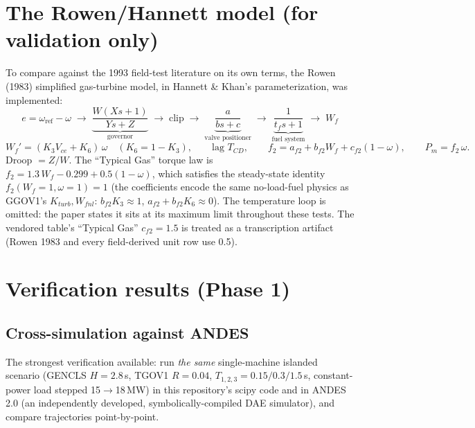 \documentclass[11pt]{article}
\begin{document}
\section{The Rowen/Hannett model (for validation only)}
\label{sec:rowen}

To compare against the 1993 field-test literature on its own terms, the
Rowen (1983) simplified gas-turbine model, in Hannett \& Khan's
parameterization, was implemented:
\begin{equation}
  e = \omega_\text{ref}-\omega
  \;\rightarrow\;
  \underbrace{\frac{W(Xs+1)}{Ys+Z}}_{\text{governor}}
  \;\rightarrow\; \text{clip}
  \;\rightarrow\;
  \underbrace{\frac{a}{bs+c}}_{\text{valve positioner}}
  \;\rightarrow\;
  \underbrace{\frac{1}{t_f s+1}}_{\text{fuel system}}
  \;\rightarrow\; W_f
\end{equation}
\begin{equation}
  W_f' = (K_3 V_{ce} + K_6)\,\omega \quad (K_6 = 1-K_3), \qquad
  \text{lag } T_{CD}, \qquad
  f_2 = a_{f2} + b_{f2}W_f + c_{f2}(1-\omega), \qquad
  P_m = f_2\,\omega .
\end{equation}
Droop $= Z/W$. The ``Typical Gas'' torque law is $f_2 = 1.3\,W_f - 0.299 +
0.5(1-\omega)$, which satisfies the steady-state identity $f_2(W_f{=}1,
\omega{=}1) = 1$ (the coefficients encode the same no-load-fuel physics as
GGOV1's $K_{turb}, W_{fnl}$: $b_{f2}K_3 \approx 1$, $a_{f2} + b_{f2}K_6
\approx 0$). The temperature loop is omitted: the paper states it sits at
its maximum limit throughout these tests. The vendored table's ``Typical
Gas'' $c_{f2} = 1.5$ is treated as a transcription artifact (Rowen 1983
and every field-derived unit row use 0.5).

\section{Verification results (Phase 1)}
\label{sec:verification}

\subsection{Cross-simulation against ANDES}
\label{sec:andescross}

The strongest verification available: run \emph{the same} single-machine
islanded scenario (GENCLS $H{=}2.8$\,s, TGOV1 $R{=}0.04$,
$T_{1,2,3}{=}0.15/0.3/1.5$\,s, constant-power load stepped
15$\rightarrow$18\,MW) in this repository's scipy code and in ANDES 2.0
(an independently developed, symbolically-compiled DAE simulator), and
compare trajectories point-by-point.
\end{document}
